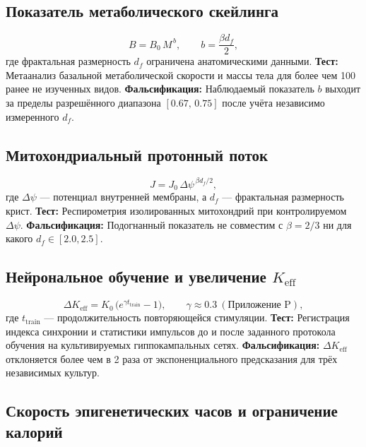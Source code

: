 \documentclass[11pt,a4paper]{article}
\begin{document}
	\subsection{Показатель метаболического скейлинга}
	
	\begin{equation}\label{eq:pred-metab}
		B = B_0\,M^{\,b}, \qquad
		b = \frac{\beta d_f}{2},
	\end{equation}
	где фрактальная размерность \(d_f\) ограничена анатомическими данными.
	\textbf{Тест:} Метаанализ базальной метаболической скорости и массы тела для более чем 100 ранее не изученных видов.
	\textbf{Фальсификация:} Наблюдаемый показатель \(b\) выходит за пределы разрешённого диапазона \([0.67,\,0.75]\) после учёта независимо измеренного \(d_f\).
	
	\subsection{Митохондриальный протонный поток}
	
	\begin{equation}\label{eq:pred-mito}
		J = J_0\,\Delta\psi^{\,\beta d_f/2},
	\end{equation}
	где \(\Delta\psi\) — потенциал внутренней мембраны, а \(d_f\) — фрактальная размерность крист.
	\textbf{Тест:} Респирометрия изолированных митохондрий при контролируемом \(\Delta\psi\).
	\textbf{Фальсификация:} Подогнанный показатель не совместим с \(\beta=2/3\) ни для какого \(d_f\in[2.0,2.5]\).
	
	\subsection{Нейрональное обучение и увеличение \(K_{\mathrm{eff}}\)}
	
	\begin{equation}\label{eq:pred-neural}
		\Delta K_{\mathrm{eff}} = K_0\,
		\bigl(e^{\gamma t_{\mathrm{train}}}-1\bigr),\qquad
		\gamma \approx 0.3\ (\text{Приложение~P}),
	\end{equation}
	где \(t_{\mathrm{train}}\) — продолжительность повторяющейся стимуляции.
	\textbf{Тест:} Регистрация индекса синхронии и статистики импульсов до и после заданного протокола обучения на культивируемых гиппокампальных сетях.
	\textbf{Фальсификация:} \(\Delta K_{\mathrm{eff}}\) отклоняется более чем в 2 раза от экспоненциального предсказания для трёх независимых культур.
	
	\subsection{Скорость эпигенетических часов и ограничение калорий}
	
\end{document}
